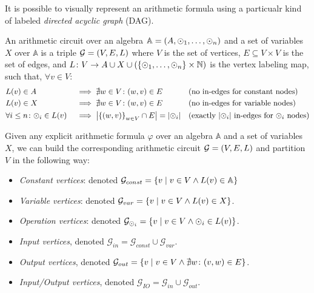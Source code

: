It is possible to visually represent an arithmetic formula using a particualr kind of labeled 
\emph{directed acyclic graph} (DAG).
\begin{definition}
  An arithmetic circuit over an algebra \(\mathbb{A} = \Tuple{A, \odot_1, \dots, \odot_n}\) and a 
  set of variables \(X\) over \(\mathbb{A}\) is a triple \(\mathcal{G} = \Tuple{V, E, L}\) where 
  \(V\) is the set of vertices, \(E \subseteq V \times V\) is the set of edges, and 
  \(L\colon V \to A \cup X \cup \Parens*{\Set{\odot_1, \dots, \odot_n} \times \mathbb{N}}\) is 
  the vertex labeling map, such that, \(\forall v \in V\):
  \begin{align*}
    & \call{L}{v} \in A && \implies \nexists w \in V\colon \Tuple{w, v} \in E
    && \textnormal{(no in-edges for constant nodes)} \\
    & \call{L}{v} \in X && \implies \nexists w \in V\colon \Tuple{w, v} \in E
    && \textnormal{(no in-edges for variable nodes)} \\
    & \forall i \le n\colon \odot_i \in \call{L}{v} && \implies \abs{\Set{\Tuple{w, v}}_{w \in V} \cap E} = \abs{\odot_i}
    && \textnormal{(exactly \(\abs{\odot_i}\) in-edges for \(\odot_i\) nodes)}
  \end{align*}
\end{definition}

Given any explicit arithmetic formula \(\varphi \) over an algebra \(\mathbb{A}\) and a set of 
variables \(X\), we can build the corresponding arithmetic circuit \(\mathcal{G} = \Tuple{V, E, L}\) 
and partition \(V\) in the following way: 
\begin{itemize}
  \item \emph{Constant vertices}: denoted 
    \(\mathcal{G}_{const} = \Set{v \mid v \in V \wedge \call{L}{v} \in \mathbb{A}}\) 
  \item \emph{Variable vertices}: denoted 
    \(\mathcal{G}_{var} = \Set{v \mid v \in V \wedge \call{L}{v} \in X}\).
  \item \emph{Operation vertices}: denoted 
    \(\mathcal{G}_{\odot_i} = \Set{v \mid v \in V \wedge \odot_i \in \call{L}{v}}\).
  \item \emph{Input vertices}, denoted 
    \(\mathcal{G}_{in} = \mathcal{G}_{const} \cup \mathcal{G}_{var}\).
  \item \emph{Output vertices}, denoted 
    \(\mathcal{G}_{out} = \Set{v \mid v \in V \wedge \nexists w\colon \Tuple{v, w} \in E}\).
  \item \emph{Input/Output vertices}, denoted \(\mathcal{G}_{IO} = \mathcal{G}_{in} \cup \mathcal{G}_{out}\).
\end{itemize}

